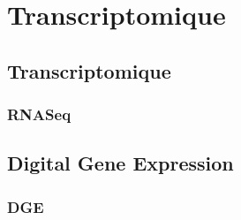 \documentclass{beamer}
\begin{document}

\section{Transcriptomique} %
\label{sec:rnaseq_dge}
\subsection{Transcriptomique} %
\label{sub:transcriptomique}


\begin{frame}
	\frametitle{RNASeq}
\end{frame}

\subsection{Digital Gene Expression} %
\label{sub:digital_gene_expression}

\begin{frame}
	\frametitle{DGE}
\end{frame}
\end{document}
